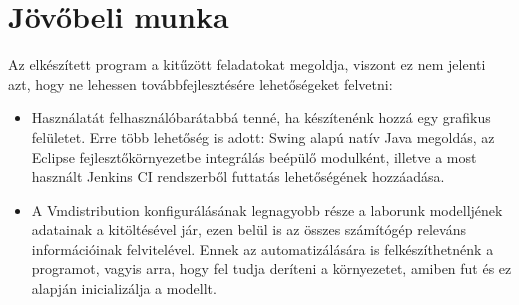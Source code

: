 \section{Jövőbeli munka}
Az elkészített program a kitűzött feladatokat megoldja, viszont ez nem jelenti azt, hogy ne lehessen továbbfejlesztésére lehetőségeket felvetni:
\begin{itemize}
  \item Használatát felhasználóbarátabbá tenné, ha készítenénk hozzá egy grafikus felületet. Erre több lehetőség is adott: Swing\cite{zukowski2005definitive} alapú natív Java megoldás, az Eclipse fejlesztőkörnyezetbe integrálás beépülő modulként, illetve a most használt Jenkins CI rendszerből futtatás lehetőségének hozzáadása.
  \item A Vmdistribution konfigurálásának legnagyobb része a laborunk modelljének adatainak a kitöltésével jár, ezen belül is az összes számítógép releváns információinak felvitelével. Ennek az automatizálására is felkészíthetnénk a programot, vagyis arra, hogy fel tudja deríteni a környezetet, amiben fut és ez alapján inicializálja a modellt.
\end{itemize}
